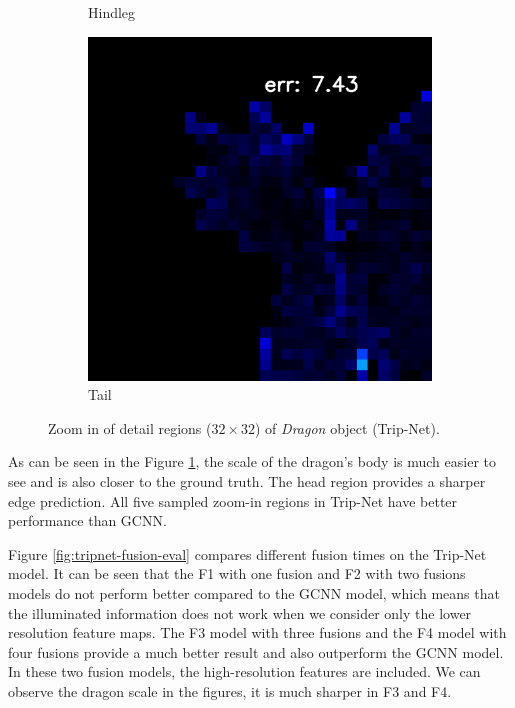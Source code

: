 \begin{figure}[H]
\begin{subfigure}[b]{0.18\linewidth}
		\caption{Hindleg}
	\end{subfigure}
	\begin{subfigure}[b]{0.18\linewidth}
		\includegraphics[width=\linewidth]{./Figures/trip_net_zoom_in/eval_7_12_-48_error.png}
		\caption{Tail}
	\end{subfigure}
	\decoRule
	\caption{Zoom in of detail regions ($ 32\times32 $) of \textit{Dragon} object (Trip-Net).}
	\label{fig:tripnet-eval-synthetic-zoom-in}
\end{figure}

As can be seen in the Figure \ref{fig:tripnet-eval-synthetic-zoom-in}, the scale of the dragon's body is much easier to see and is also closer to the ground truth. The head region provides a sharper edge prediction. All five sampled zoom-in regions in Trip-Net have better performance than GCNN. 


Figure \ref{fig:tripnet-fusion-eval} compares different fusion times on the Trip-Net model. It can be seen that the F1 with one fusion and F2 with two fusions models do not perform better compared to the GCNN model, which means that the illuminated information does not work when we consider only the lower resolution feature maps. The F3 model with three fusions and the F4 model with four fusions provide a much better result and also outperform the GCNN model. In these two fusion models, the high-resolution features are included. We can observe the dragon scale in the figures, it is much sharper in F3 and F4.


